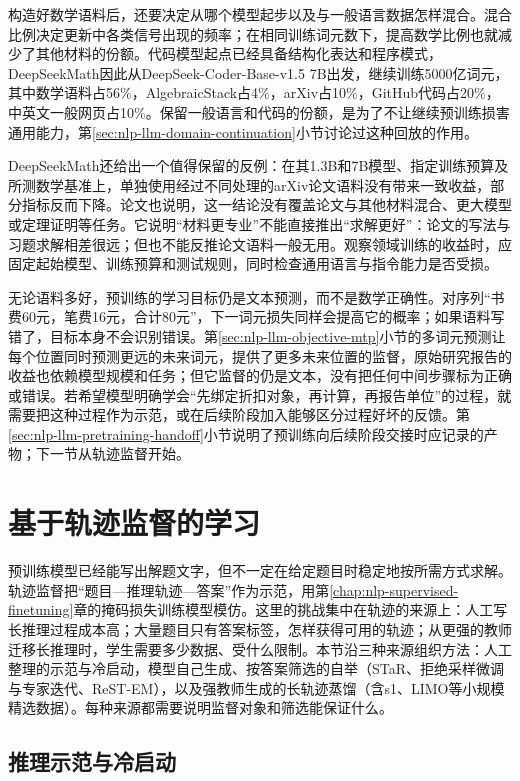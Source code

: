 构造好数学语料后，还要决定从哪个模型起步以及与一般语言数据怎样混合。混合比例决定更新中各类信号出现的频率；在相同训练词元数下，提高数学比例也就减少了其他材料的份额。代码模型起点已经具备结构化表达和程序模式，DeepSeekMath因此从DeepSeek-Coder-Base-v1.5 7B出发，继续训练5000亿词元，其中数学语料占56\%，AlgebraicStack占4\%，arXiv占10\%，GitHub代码占20\%，中英文一般网页占10\%。保留一般语言和代码的份额，是为了不让继续预训练损害通用能力，第\ref{sec:nlp-llm-domain-continuation}小节讨论过这种回放的作用。

DeepSeekMath还给出一个值得保留的反例：在其1.3B和7B模型、指定训练预算及所测数学基准上，单独使用经过不同处理的arXiv论文语料没有带来一致收益，部分指标反而下降。论文也说明，这一结论没有覆盖论文与其他材料混合、更大模型或定理证明等任务。它说明“材料更专业”不能直接推出“求解更好”：论文的写法与习题求解相差很远；但也不能反推论文语料一般无用。观察领域训练的收益时，应固定起始模型、训练预算和测试规则，同时检查通用语言与指令能力是否受损。

无论语料多好，预训练的学习目标仍是文本预测，而不是数学正确性。对序列“书费60元，笔费16元，合计80元”，下一词元损失同样会提高它的概率；如果语料写错了，目标本身不会识别错误。第\ref{sec:nlp-llm-objective-mtp}小节的多词元预测让每个位置同时预测更远的未来词元，提供了更多未来位置的监督，原始研究报告的收益也依赖模型规模和任务；但它监督的仍是文本，没有把任何中间步骤标为正确或错误。若希望模型明确学会“先绑定折扣对象，再计算，再报告单位”的过程，就需要把这种过程作为示范，或在后续阶段加入能够区分过程好坏的反馈。第\ref{sec:nlp-llm-pretraining-handoff}小节说明了预训练向后续阶段交接时应记录的产物；下一节从轨迹监督开始。

\section{基于轨迹监督的学习}
\label{sec:nlp-reasoning-sft}

预训练模型已经能写出解题文字，但不一定在给定题目时稳定地按所需方式求解。轨迹监督把“题目—推理轨迹—答案”作为示范，用第\ref{chap:nlp-supervised-finetuning}章的掩码损失训练模型模仿。这里的挑战集中在轨迹的来源上：人工写长推理过程成本高；大量题目只有答案标签，怎样获得可用的轨迹；从更强的教师迁移长推理时，学生需要多少数据、受什么限制。本节沿三种来源组织方法：人工整理的示范与冷启动，模型自己生成、按答案筛选的自举（STaR、拒绝采样微调与专家迭代、ReST-EM），以及强教师生成的长轨迹蒸馏（含s1、LIMO等小规模精选数据）。每种来源都需要说明监督对象和筛选能保证什么。

\subsection{推理示范与冷启动}
\label{sec:nlp-reasoning-demonstrations}

